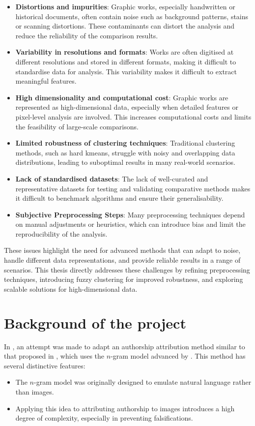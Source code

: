 \begin{toReview}
		\begin{itemize}
			\item \textbf{Distortions and impurities}: Graphic works, especially handwritten or historical documents, often contain noise such as background patterns, stains or scanning distortions. These contaminants can distort the analysis and reduce the reliability of the comparison results.
			\item \textbf{Variability in resolutions and formats}: Works are often digitised at different resolutions and stored in different formats, making it difficult to standardise data for analysis. This variability makes it difficult to extract meaningful features.
			\item \textbf{High dimensionality and computational cost}: Graphic works are represented as high-dimensional data, especially when detailed features or pixel-level analysis are involved. This increases computational costs and limits the feasibility of large-scale comparisons.
			\item \textbf{Limited robustness of clustering techniques}: Traditional clustering methods, such as hard \gls{kmeans}, struggle with noisy and overlapping data distributions, leading to suboptimal results in many real-world scenarios.
			\item \textbf{Lack of standardised datasets}: The lack of well-curated and representative datasets for testing and validating comparative methods makes it difficult to benchmark algorithms and ensure their generalisability.
			\item \textbf{Subjective Preprocessing Steps}: Many preprocessing techniques depend on manual adjustments or heuristics, which can introduce bias and limit the reproducibility of the analysis.
		\end{itemize}

		\noindent These issues highlight the need for advanced methods that can adapt to noise, handle different data representations, and provide reliable results in a range of scenarios. This thesis directly addresses these challenges by refining preprocessing techniques, introducing fuzzy clustering for improved robustness, and exploring scalable solutions for high-dimensional data.

	\section{Background of the project}
		In \cite{thesis}, an attempt was made to adapt an authorship attribution method similar to that proposed in \cite{SapAttribution}, which uses the $n$-gram model advanced by \citet{Shannon_ngrammodel}. This method has several distinctive features:
		\begin{itemize}
			\item The $n$-gram model was originally designed to emulate natural language rather than images.
			\item Applying this idea to attributing authorship to images introduces a high degree of complexity, especially in preventing falsifications.
		\end{itemize}


\end{toReview}
